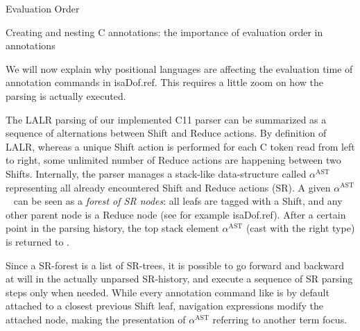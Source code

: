 \begin{isabellebody}
\begin{isamarkuptext}
\end{isamarkuptext}\isamarkuptrue%
%
\begin{isamarkupsubsection*}%
[label = {annot2},type = {scholarly_paper.technical}, args={label = {annot2},type = {scholarly_paper.technical}, scholarly_paper.text_section.main_author = {@{docitem ''fred''}}, Isa_COL.text_element.level = {}, Isa_COL.text_element.referentiable = {False}, Isa_COL.text_element.variants = {{STR ''outline'', STR ''document''}}, scholarly_paper.text_section.fixme_list = {}, Isa_COL.text_element.level = {}, scholarly_paper.technical.definition_list = {}}]Evaluation Order%
\end{isamarkupsubsection*}\isamarkuptrue%
%
\begin{isamarkupfigure*}%
[label = {C-sample5},type = {Isa_COL.figure}, args={label = {C-sample5},type = {Isa_COL.figure}, Isa_COL.figure.relative_width = {62}, Isa_COL.figure.src = {figures/A-C-Source5}, Isa_COL.figure.spawn_columns = {True}}]Creating and nesting C annotations: the importance of evaluation order in annotations%
\end{isamarkupfigure*}\isamarkuptrue%
%
\begin{isamarkuptext}%
We will now explain why positional languages are affecting the evaluation time of
annotation commands in \csname isaDof.ref. This requires a little zoom on how the
parsing is actually executed.

The LALR parsing of our implemented C11 parser can be summarized as a sequence of alternations
between Shift and Reduce actions. By definition of LALR, whereas a unique Shift action is performed
for each C token read from left to right, some unlimited number of Reduce actions are happening
between two Shifts. Internally, the parser manages a stack-like data-structure called
$\alpha^{\text{AST}}$~ representing all already encountered Shift and
Reduce actions (SR). A given $\alpha^{\text{AST}}$~ can be seen as a
\emph{forest of SR nodes}: all leafs are tagged with a Shift, and any other parent
node is a Reduce node (see for example \csname isaDof.ref). After a
certain point in the parsing history, the top stack element $\alpha^{\text{AST}}$ (cast with the
right type) is returned to .

Since a SR-forest is a list of SR-trees, it is possible to go forward and backward at will in the
actually unparsed SR-history, and execute a sequence of SR parsing steps only when needed. While
every annotation command like  is by default attached to
a closest previous Shift leaf, navigation expressions modify the attached node, making the
presentation of $\alpha^{\text{AST}}$ referring to another term focus.


\end{isamarkuptext}
\end{isabellebody}
